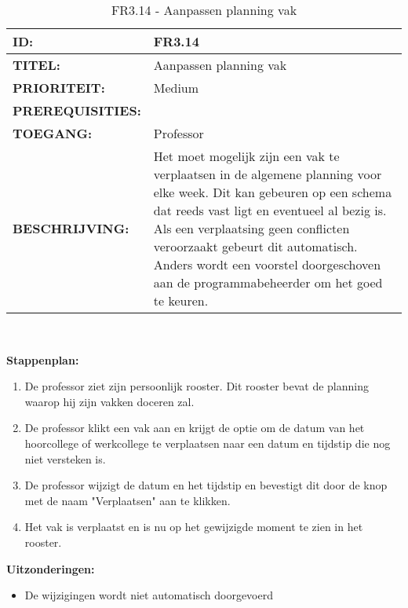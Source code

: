 \noindent\begin{table}[H]
            \begin{tabular}{l | p{10cm}}
                \textbf{ID:} & FR3.14 \\ \hline
                \textbf{TITEL:} & Aanpassen planning vak\\ \hline
                \textbf{PRIORITEIT:} &  Medium \\ \hline
                \textbf{PREREQUISITIES:} & \\ \hline
                \textbf{TOEGANG:} & Professor \\ \hline
                \textbf{BESCHRIJVING:} & Het moet mogelijk zijn een vak te verplaatsen in de algemene planning voor elke week. Dit kan gebeuren op een schema dat reeds vast ligt en eventueel al bezig is. Als een verplaatsing geen conflicten veroorzaakt gebeurt dit automatisch. Anders wordt een voorstel doorgeschoven aan de programmabeheerder om het goed te keuren.\\
            \end{tabular}\\
            \caption{FR3.14 - Aanpassen planning vak}
            \label{tab:FR3.14 - Aanpassen planning vak}
        \end{table}

\textbf{Stappenplan:}
\begin{enumerate}
\item De professor ziet zijn persoonlijk rooster. Dit rooster bevat de planning waarop hij zijn vakken doceren zal.
\item De professor klikt een vak aan en krijgt de optie om de datum van het  hoorcollege of werkcollege te verplaatsen naar een datum en tijdstip die nog niet versteken is.
\item De professor wijzigt de datum en het tijdstip en bevestigt dit door de knop met de naam "Verplaatsen" aan te klikken.
\item Het vak is verplaatst en is nu op het gewijzigde moment te zien in het rooster.
\end{enumerate}

\textbf{Uitzonderingen:}
\begin{itemize}
\item De wijzigingen wordt niet automatisch doorgevoerd
\end{itemize}

